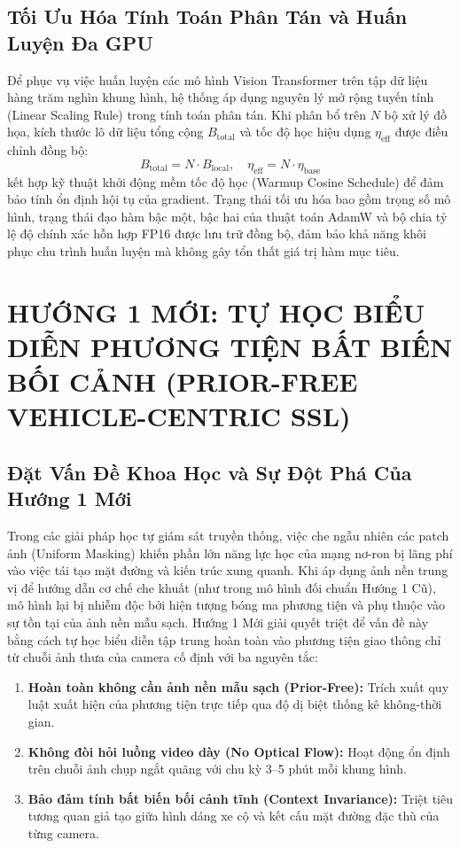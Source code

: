 \documentclass[11pt,a4paper]{article}
\begin{document}
\subsection{Tối Ưu Hóa Tính Toán Phân Tán và Huấn Luyện Đa GPU}
Để phục vụ việc huấn luyện các mô hình Vision Transformer trên tập dữ liệu hàng trăm nghìn khung hình, hệ thống áp dụng nguyên lý mở rộng tuyến tính (Linear Scaling Rule) trong tính toán phân tán. Khi phân bổ trên $N$ bộ xử lý đồ họa, kích thước lô dữ liệu tổng cộng $B_{\text{total}}$ và tốc độ học hiệu dụng $\eta_{\text{eff}}$ được điều chỉnh đồng bộ:
\begin{equation}
    B_{\text{total}} = N \cdot B_{\text{local}}, \quad \eta_{\text{eff}} = N \cdot \eta_{\text{base}}
\end{equation}
kết hợp kỹ thuật khởi động mềm tốc độ học (Warmup Cosine Schedule) để đảm bảo tính ổn định hội tụ của gradient. Trạng thái tối ưu hóa bao gồm trọng số mô hình, trạng thái đạo hàm bậc một, bậc hai của thuật toán AdamW và bộ chia tỷ lệ độ chính xác hỗn hợp FP16 được lưu trữ đồng bộ, đảm bảo khả năng khôi phục chu trình huấn luyện mà không gây tổn thất giá trị hàm mục tiêu.

\section{HƯỚNG 1 MỚI: TỰ HỌC BIỂU DIỄN PHƯƠNG TIỆN BẤT BIẾN BỐI CẢNH (PRIOR-FREE VEHICLE-CENTRIC SSL)}

\subsection{Đặt Vấn Đề Khoa Học và Sự Đột Phá Của Hướng 1 Mới}
Trong các giải pháp học tự giám sát truyền thống, việc che ngẫu nhiên các patch ảnh (Uniform Masking) khiến phần lớn năng lực học của mạng nơ-ron bị lãng phí vào việc tái tạo mặt đường và kiến trúc xung quanh. Khi áp dụng ảnh nền trung vị để hướng dẫn cơ chế che khuất (như trong mô hình đối chuẩn Hướng 1 Cũ), mô hình lại bị nhiễm độc bởi hiện tượng bóng ma phương tiện và phụ thuộc vào sự tồn tại của ảnh nền mẫu sạch.
Hướng 1 Mới giải quyết triệt để vấn đề này bằng cách tự học biểu diễn tập trung hoàn toàn vào phương tiện giao thông chỉ từ chuỗi ảnh thưa của camera cố định với ba nguyên tắc:
\begin{enumerate}
    \item \textbf{Hoàn toàn không cần ảnh nền mẫu sạch (Prior-Free):} Trích xuất quy luật xuất hiện của phương tiện trực tiếp qua độ dị biệt thống kê không-thời gian.
    \item \textbf{Không đòi hỏi luồng video dày (No Optical Flow):} Hoạt động ổn định trên chuỗi ảnh chụp ngắt quãng với chu kỳ 3--5 phút mỗi khung hình.
    \item \textbf{Bảo đảm tính bất biến bối cảnh tĩnh (Context Invariance):} Triệt tiêu tương quan giả tạo giữa hình dáng xe cộ và kết cấu mặt đường đặc thù của từng camera.
\end{enumerate}
\end{document}

